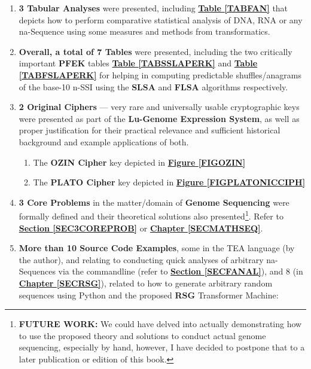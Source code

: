 \documentclass[a4paper, 18pt]{book} %
\begin{document}
\begin{enumerate}
{\begin{enumerate}
	\item \textbf{\hyperref[ALGCOZINPLATO_ORIG]{Algorithm \ref{ALGCOZINPLATO_ORIG}}}: The [original] \textbf{LGES Algorithm} --- renders the genome expression using complement sequences.
	\end{enumerate}
}
\item \textbf{3 Tabular Analyses} were presented, including \textbf{\hyperref[TABFAN]{Table \ref{TABFAN}}} that depicts how to perform comparative statistical analysis of DNA, RNA or any na-Sequence using some measures and methods from transformatics.
\item \textbf{Overall, a total of 7 Tables} were presented, including the two critically important \textbf{PFEK} tables \textbf{\hyperref[TABSSLAPERK]{Table \ref{TABSSLAPERK}}} and \textbf{\hyperref[TABFSLAPERK]{Table \ref{TABFSLAPERK}}} for helping in computing predictable shuffles/anagrams of the base-10 n-SSI using the \textbf{SLSA} and \textbf{FLSA} algorithms respectively.
\item{ \textbf{2 Original Ciphers} --- very rare and universally usable cryptographic keys were presented as part of the \textbf{Lu-Genome Expression System}, as well as proper justification for their practical relevance and sufficient historical background and example applications of both.

\begin{enumerate}
\item The \textbf{OZIN Cipher} key depicted in \textbf{\hyperref[FIGOZIN]{Figure \ref{FIGOZIN}}}
\item The \textbf{PLATO Cipher} key depicted in \textbf{\hyperref[FIGPLATONICCIPH]{Figure \ref{FIGPLATONICCIPH}}}
\end{enumerate}

}
\item \textbf{3 Core Problems} in the matter/domain of \textbf{Genome Sequencing} were formally defined and their theoretical solutions also presented\footnote{\textbf{FUTURE WORK:} We could have delved into actually demonstrating how to use the proposed theory and solutions to conduct actual genome sequencing, especially by hand, however, I have decided to postpone that to a later publication or edition of this book.}. Refer to  \textbf{\hyperref[SEC3COREPROB]{Section \ref{SEC3COREPROB}}} or \textbf{\hyperref[SECMATHSEQ]{Chapter \ref{SECMATHSEQ}}}.

\item{ \textbf{More than 10 Source Code Examples}, some in the TEA language (by the author\cite{cli_tttt}), and relating to conducting quick analyses of arbitrary na-Sequences via the commandline (refer to \textbf{\hyperref[SECFANAL]{Section \ref{SECFANAL}}}), and 8 (in \textbf{\hyperref[SECRSG]{Chapter \ref{SECRSG}}}), related to how to generate arbitrary random sequences using Python and the proposed \textbf{RSG} Transformer Machine:

}
\end{enumerate}
\end{document}
